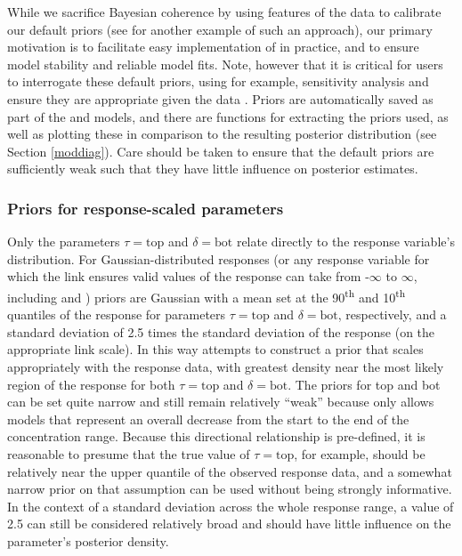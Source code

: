 \documentclass[
  shortnames]{jss}
\begin{document}
While we sacrifice Bayesian coherence by using features of the data to calibrate our default priors (see \citet{chipman2010} for another example of such an approach), our primary motivation is to facilitate easy implementation of  in practice, and to ensure model stability and reliable model fits. Note, however that it is critical for users to interrogate these default priors, using for example, sensitivity analysis \citep{depaoli2020importance} and ensure they are appropriate given the data \citep{gelman2017entropy}. Priors are automatically saved as part of the  and  models, and there are functions for extracting the priors used, as well as plotting these in comparison to the resulting posterior distribution (see Section \ref{moddiag}). Care should be taken to ensure that the default priors are sufficiently weak such that they have little influence on posterior estimates.

\hypertarget{priors-for-response-scaled-parameters}{%
\subsubsection{Priors for response-scaled parameters}\label{priors-for-response-scaled-parameters}}

Only the parameters \(\tau = \text{top}\) and \(\delta = \text{bot}\) relate directly to the response variable's distribution. For Gaussian-distributed responses (or any response variable for which the link ensures valid values of the response can take from -\(\infty\) to \(\infty\), including  and ) priors are Gaussian with a mean set at the 90\textsuperscript{th} and 10\textsuperscript{th} quantiles of the response for parameters \(\tau = \text{top}\) and \(\delta = \text{bot}\), respectively, and a standard deviation of 2.5 times the standard deviation of the response (on the appropriate link scale). In this way  attempts to construct a prior that scales appropriately with the response data, with greatest density near the most likely region of the response for both \(\tau = \text{top}\) and \(\delta = \text{bot}\). The priors for top and bot can be set quite narrow and still remain relatively ``weak'' because  only allows models that represent an overall decrease from the start to the end of the concentration range. Because this directional relationship is pre-defined, it is reasonable to presume that the true value of \(\tau = \text{top}\), for example, should be relatively near the upper quantile of the observed response data, and a somewhat narrow prior on that assumption can be used without being strongly informative. In the context of a standard deviation across the whole response range, a value of 2.5 can still be considered relatively broad and should have little influence on the parameter's posterior density.
\end{document}
